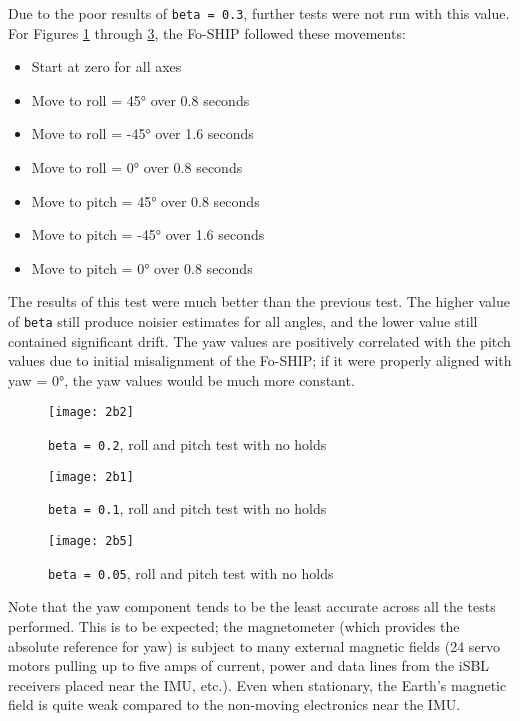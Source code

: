 \documentclass[12pt,a4paper]{report}
\begin{document}
\pagebreak

Due to the poor results of \verb|beta = 0.3|, further tests were not run with this value. For Figures \ref{fig:2b2} through \ref{fig:2b05}, the Fo-SHIP followed these movements:
\begin{itemize}[noitemsep,topsep=0pt,]
	\item Start at zero for all axes
	\item Move to roll = 45° over 0.8 seconds
	\item Move to roll = -45° over 1.6 seconds
	\item Move to roll = 0° over 0.8 seconds
	\item Move to pitch = 45° over 0.8 seconds
	\item Move to pitch = -45° over 1.6 seconds
	\item Move to pitch = 0° over 0.8 seconds
\end{itemize}

The results of this test were much better than the previous test. The higher value of \verb|beta| still produce noisier estimates for all angles, and the lower value still contained significant drift. The yaw values are positively correlated with the pitch values due to initial misalignment of the Fo-SHIP; if it were properly aligned with yaw = 0°, the yaw values would be much more constant.

\begin{figure}[htbp]
	\centering
	\texttt{[image: 2b2]}
	\caption{\texttt{beta = 0.2}, roll and pitch test with no holds}
	\label{fig:2b2}
\end{figure}

\begin{figure}[htbp]
	\centering
	\texttt{[image: 2b1]}
	\caption{\texttt{beta = 0.1}, roll and pitch test with no holds}
	\label{fig:2b1}
\end{figure}

\begin{figure}[htbp]
	\centering
	\texttt{[image: 2b5]}
	\caption{\texttt{beta = 0.05}, roll and pitch test with no holds}
	\label{fig:2b05}
\end{figure}

Note that the yaw component tends to be the least accurate across all the tests performed. This is to be expected; the magnetometer (which provides the absolute reference for yaw) is subject to many external magnetic fields (24 servo motors pulling up to five amps of current, power and data lines from the iSBL receivers placed near the IMU, etc.). Even when stationary, the Earth’s magnetic field is quite weak compared to the non-moving electronics near the IMU.
\end{document}
